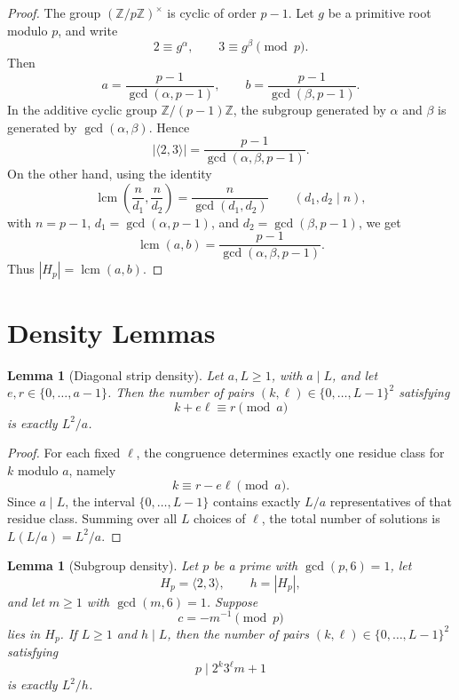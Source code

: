 \documentclass[11pt]{article}
\newtheorem{lemma}[theorem]{Lemma}
\theoremstyle{definition}
\theoremstyle{remark}
\DeclareMathOperator{\lcm}{lcm}
\begin{document}
\begin{proof}
The group \((\mathbb Z/p\mathbb Z)^\times\) is cyclic of order \(p-1\).  Let
\(g\) be a primitive root modulo \(p\), and write
\[
        2\equiv g^\alpha,\qquad 3\equiv g^\beta \pmod p.
\]
Then
\[
        a=\frac{p-1}{\gcd(\alpha,p-1)},\qquad
        b=\frac{p-1}{\gcd(\beta,p-1)}.
\]
In the additive cyclic group \(\mathbb Z/(p-1)\mathbb Z\), the subgroup
generated by \(\alpha\) and \(\beta\) is generated by
\(\gcd(\alpha,\beta)\).  Hence
\[
        |\langle 2,3\rangle|
        =
        \frac{p-1}{\gcd(\alpha,\beta,p-1)}.
\]
On the other hand, using the identity
\[
        \lcm\left(\frac n{d_1},\frac n{d_2}\right)
        =
        \frac n{\gcd(d_1,d_2)}
        \qquad(d_1,d_2\mid n),
\]
with \(n=p-1\), \(d_1=\gcd(\alpha,p-1)\), and
\(d_2=\gcd(\beta,p-1)\), we get
\[
        \lcm(a,b)
        =
        \frac{p-1}{\gcd(\alpha,\beta,p-1)}.
\]
Thus \(|H_p|=\lcm(a,b)\).
\end{proof}

\section{Density Lemmas}

\begin{lemma}[Diagonal strip density]
Let \(a,L\geq 1\), with \(a\mid L\), and let \(e,r\in\{0,\ldots,a-1\}\).
Then the number of pairs \((k,\ell)\in\{0,\ldots,L-1\}^2\) satisfying
\[
        k+e\ell\equiv r\pmod a
\]
is exactly \(L^2/a\).
\end{lemma}

\begin{proof}
For each fixed \(\ell\), the congruence determines exactly one residue class
for \(k\) modulo \(a\), namely
\[
        k\equiv r-e\ell\pmod a.
\]
Since \(a\mid L\), the interval \(\{0,\ldots,L-1\}\) contains exactly \(L/a\)
representatives of that residue class.  Summing over all \(L\) choices of
\(\ell\), the total number of solutions is \(L(L/a)=L^2/a\).
\end{proof}

\begin{lemma}[Subgroup density]
Let \(p\) be a prime with \(\gcd(p,6)=1\), let
\[
        H_p=\langle 2,3\rangle,\qquad h=|H_p|,
\]
and let \(m\geq 1\) with \(\gcd(m,6)=1\).  Suppose
\[
        c=-m^{-1}\pmod p
\]
lies in \(H_p\).  If \(L\geq 1\) and \(h\mid L\), then the number of pairs
\((k,\ell)\in\{0,\ldots,L-1\}^2\) satisfying
\[
        p\mid 2^k3^\ell m+1
\]
is exactly \(L^2/h\).
\end{lemma}
\end{document}
